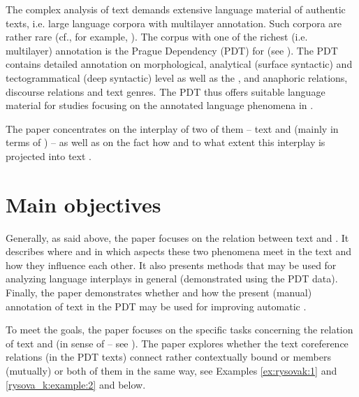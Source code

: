 \documentclass[output=paper]{langsci/langscibook.cls}
\begin{document}
The complex analysis of text  demands extensive language material of authentic texts, i.e. large language corpora with multilayer annotation. Such corpora are rather rare (cf., for example, \citealt{komen2012coreferenced, Stede2014, Chiarcos2014}). The corpus with one of the richest (i.e. multilayer) annotation is the Prague Dependency  (PDT) for  (see \citealt{Bejcek2013}). The PDT contains detailed annotation on morphological, analytical (surface syntactic) and tectogrammatical (deep syntactic) level as well as the ,  and anaphoric relations, discourse relations and text genres. The PDT thus offers suitable language material for studies focusing on the annotated language phenomena in .

The paper concentrates on the interplay of two of them -- text  and  (mainly in terms of ) -- as well as on the fact how and to what extent this interplay is projected into text .

\section{Main objectives\label{rysova_k:sec:MainObjectives}}

Generally, as said above, the paper focuses on the relation between text  and . It describes where and in which aspects these two phenomena meet in the text and how they influence each other. It also presents methods that may be used for analyzing language interplays in general (demonstrated using the PDT data). Finally, the paper demonstrates whether and how the present (manual) annotation of text  in the PDT may be used for improving automatic .

To meet the goals, the paper focuses on the specific tasks concerning the relation of text  and  (in sense of  -- see ). The paper explores whether the text coreference relations (in the PDT texts) connect rather contextually bound or  members (mutually) or both of them in the same way, see Examples \ref{ex:rysovak:1} and \ref{rysova_k:example:2} and  below.
\end{document}
